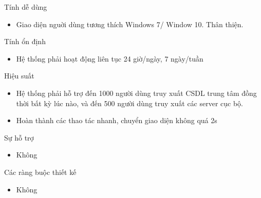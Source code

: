 \documentclass{article}
\begin{document}
Tính dễ dùng
\begin{itemize}
    \item Giao diện nguời dùng tương thích Windows 7/ Window 10. Thân thiện.
\end{itemize}

Tính ổn định
\begin{itemize}
    \item Hệ thống phải hoạt động liên tục 24 giờ/ngày, 7 ngày/tuần
\end{itemize}

Hiệu suất
\begin{itemize}
    \item Hệ thống phải hỗ trợ đến 1000 người dùng truy xuất CSDL trung tâm đồng thời bất kỳ lúc nào, và đến 500 người dùng truy xuất các server cục bộ. 
    \item Hoàn thành các thao tác nhanh, chuyển giao diện không quá 2s
\end{itemize}

Sự hỗ trợ
\begin{itemize}
    \item Không
\end{itemize}

Các ràng buộc thiết kế
\begin{itemize}
    \item Không
\end{itemize}
\newpage
\end{document}
